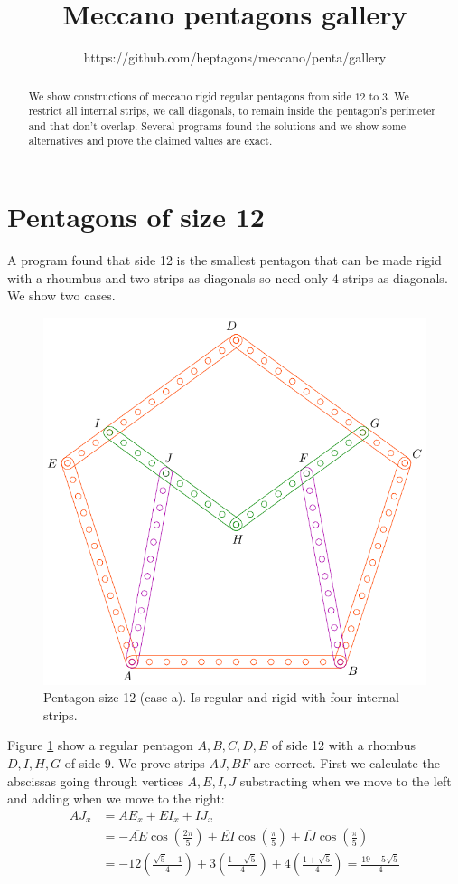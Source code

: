 \documentclass[11pt]{article}
\title{Meccano pentagons gallery}
\author{https://github.com/heptagons/meccano/penta/gallery}
\date{}
\begin{document}
\maketitle
\begin{abstract}
We show constructions of meccano rigid regular pentagons from side $12$ to $3$. We restrict all internal strips, we call diagonals, to remain inside the pentagon's perimeter and that don't overlap.
Several programs found the solutions and we show some alternatives and prove the claimed values are exact.
\end{abstract}

\section{Pentagons of size 12}

A program found that side 12 is the smallest pentagon that can be made rigid with a rhoumbus and two strips as diagonals so need only 4 strips as diagonals. We show two cases.

\begin{figure}[h]
 \centering
 \includegraphics[scale=1]{12/penta12a}
 \caption{Pentagon size 12 (case a). Is regular and rigid with four internal strips.}
 \label{fig:penta12a}
\end{figure}

Figure \ref{fig:penta12a} show a regular pentagon $A,B,C,D,E$ of side 12 with a rhombus $D,I,H,G$ of side $9$. We prove strips $AJ,BF$ are correct. First we calculate the abscissas going through vertices $A,E,I,J$ substracting when we move to the left and adding when we move to the right:
\begin{align}
AJ_x &= AE_x + EI_x + IJ_x\\
 &= -\overline{AE}\cos\left(\frac{2\pi}5\right)
 + \overline{EI}\cos\left(\frac{\pi}5\right) 
 + \overline{IJ}\cos\left(\frac{\pi}5\right)\nonumber\\
 &= -12\left(\frac{\sqrt5 - 1}4\right)
  +3\left(\frac{1+\sqrt5}4\right)
  +4\left(\frac{1+\sqrt5}4\right) = \frac{19-5\sqrt5}4
\end{align}
\end{document}
